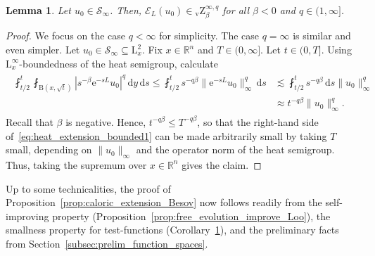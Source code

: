 \documentclass[11pt, leqno]{amsart}
\newtheorem{lemma}[theorem]{Lemma}
\theoremstyle{definition}
\newcommand{\R}{\mathbb{R}}
\renewcommand{\L}{\mathrm{L}}
\newcommand{\Zv}{{}_\mathrm{v}\mathrm{Z}}
\newcommand{\Soo}{\mathcal{S}_\infty}
\newcommand{\Ext}{\mathcal{E}}
\newcommand{\e}{\mathrm{e}}
\renewcommand{\d}{\,\mathrm{d}}
\newcommand{\B}{\mathrm{B}}
\begin{document}
	\begin{lemma}
		\label{lem:heat_extension_bounded}
		Let $u_0 \in \Soo$. Then, $\Ext_{L}(u_0) \in \Zv^{\infty,{q}}_\beta$ for all $\beta < 0$ {and $q\in (1,\infty]$}.
	\end{lemma}

	\begin{proof}
		We focus on the case $q < \infty$ for simplicity. The case $q = \infty$ is similar and even simpler.
		Let $u_0 \in \Soo \subseteq \L^2_x$.
		Fix $x\in \R^n$ and $T \in (0,\infty]$. Let $t \in (0,T]$. Using $\L^\infty_x$-boundedness of the heat semigroup, calculate
		\begin{align}
			\label{eq:heat_extension_bounded1}
			\begin{split}
				\fint_{t/2}^t \fint_{\B(x,\sqrt{t})} |s^{-\beta} \e^{-sL} u_0|^q \d y \d s \leq \fint_{t/2}^t s^{-q\beta} \| \e^{-sL} u_0 \|_\infty^q \d s &\lesssim \fint_{t/2}^t s^{-q\beta} \d s \| u_0 \|_\infty^q \\
				&\approx t^{-q\beta} \| u_0 \|_\infty^q.
			\end{split}
		\end{align}
		Recall that $\beta$ is negative.
		Hence, $t^{-q\beta} \leq T^{-q\beta}$, so that the right-hand side of~\eqref{eq:heat_extension_bounded1} can be made arbitrarily small by taking $T$ small, depending on $\| u_0 \|_\infty$ and the operator norm of the heat semigroup. Thus, taking the supremum over $x\in \R^n$ gives the claim.
	\end{proof}



	Up to some technicalities, the proof of Proposition~\ref{prop:caloric_extension_Besov} now follows readily from the self-improving property (Proposition~\ref{prop:free_evolution_improve_Loo}), the smallness property for test-functions (Corollary~\ref{lem:heat_extension_bounded}), and the preliminary facts from Section~\ref{subsec:prelim_function_spaces}.
\end{document}
